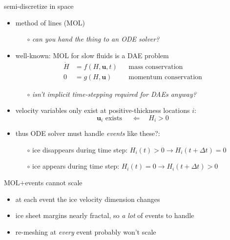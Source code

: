 \documentclass[hide notes,intlimits,usenames,dvipsnames]{beamer}
\begin{document}
\begin{frame}{semi-discretize in space}

\begin{itemize}
\item method of lines (MOL)
    \begin{itemize}
    \item[$\circ$] \emph{can you hand the thing to an ODE solver?}
    \end{itemize}
\item well-known: MOL for slow fluids is a DAE problem
\begin{align*}
\dot H &= f(H,\mathbf{u},t) && \text{mass conservation} \\
     0 &= g(H,\mathbf{u})   && \text{momentum conservation}
\end{align*}
\vspace{-5mm}
    \begin{itemize}
    \item[$\circ$] \emph{isn't implicit time-stepping required for DAEs anyway?}
    \end{itemize}
\item velocity variables only exist at positive-thickness locations $i$:
    $$\mathbf{u}_i \text{ exists } \quad \Longleftarrow \quad H_i > 0$$
\item thus ODE solver must handle \emph{events} like these?:
    \begin{itemize}
    \item[$\circ$] ice disappears during time step:  $H_i(t)>0 \to H_i(t+\Delta t)=0$
    \item[$\circ$] ice appears during time step:  $H_i(t)=0 \to H_i(t+\Delta t)>0$
    \end{itemize}
\end{itemize}
\end{frame}


\begin{frame}{MOL$+$events cannot scale}

\begin{center}

\end{center}

\vspace{-6mm}
\begin{itemize}
\item at each event the ice velocity dimension changes
\item ice sheet margins nearly fractal, so \emph{a lot} of events to handle
\item re-meshing at \emph{every} event probably won't scale
\end{itemize}
\end{frame}
\end{document}

